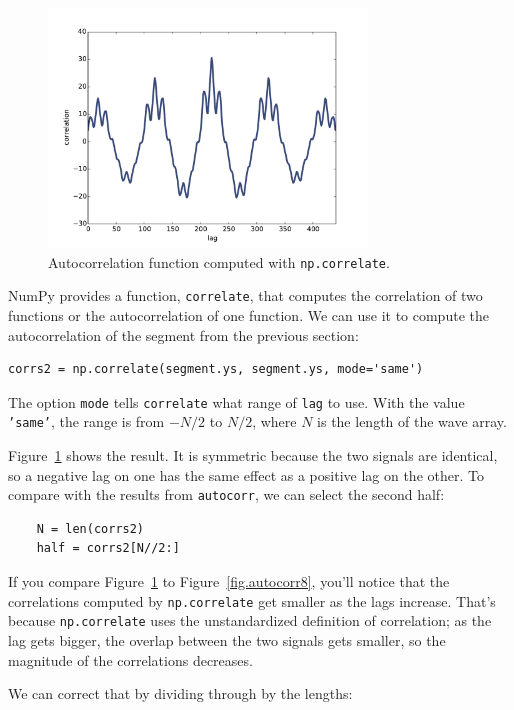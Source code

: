 \documentclass[12pt]{book}
\begin{document}
\begin{figure}
\centerline{\includegraphics[height=2.5in]{figs/autocorr9.pdf}}
\caption{Autocorrelation function computed with {\tt np.correlate}.}
\label{fig.autocorr9}
\end{figure}

NumPy provides a function, {\tt correlate}, that computes
the correlation of two functions or the autocorrelation of one
function.  We can use it to compute the autocorrelation of
the segment from the previous section:

\begin{verbatim}
corrs2 = np.correlate(segment.ys, segment.ys, mode='same')
\end{verbatim}

The option {\tt mode} tells {\tt correlate} what range
of {\tt lag} to use.  With the value {\tt 'same'}, the
range is from $-N/2$ to $N/2$, where $N$ is the length of the
wave array.

Figure~\ref{fig.autocorr9} shows the result.  It is symmetric because
the two signals are identical, so a negative lag on one has the same
effect as a positive lag on the other.  To compare with the results
from {\tt autocorr}, we can select the second half:

\begin{verbatim}
    N = len(corrs2)
    half = corrs2[N//2:]
\end{verbatim}

If you compare Figure~\ref{fig.autocorr9} to Figure~\ref{fig.autocorr8},
you'll notice that the correlations computed by {\tt np.correlate}
get smaller as the lags increase.  That's because {\tt np.correlate}
uses the unstandardized definition of correlation;
as the lag gets bigger, the
overlap between the two signals gets smaller, so the magnitude of
the correlations decreases.

We can correct that by dividing through by the lengths:
\end{document}
